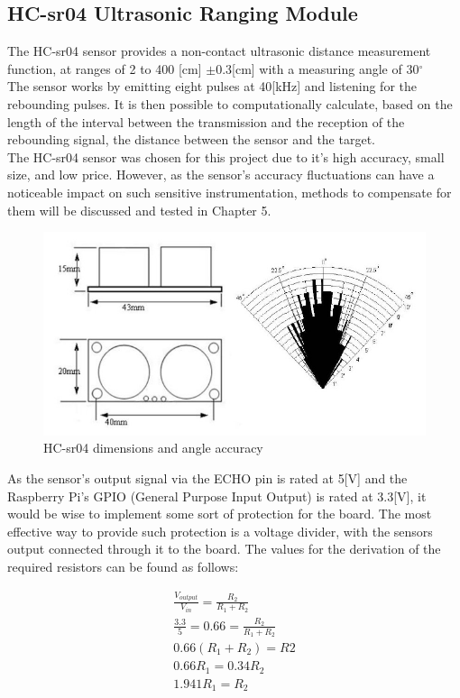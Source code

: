 \documentclass[twoside]{ctuthesis}
\theoremstyle{plain}
\theoremstyle{definition}
\theoremstyle{note}
\begin{document}
\subsection{HC-sr04 Ultrasonic Ranging Module}
The HC-sr04 sensor provides a non-contact ultrasonic distance measurement function, at ranges of 2 to 400 [cm] $\pm$0.3[cm] with a measuring angle of 30$^\circ$\\
The sensor works by emitting eight pulses at 40[kHz] and listening for the rebounding pulses. It is then possible to computationally calculate, based on the length of the interval between the transmission and the reception of the rebounding signal, the distance between the sensor and the target.\\
The HC-sr04 sensor was chosen for this project due to it's high accuracy, small size, and low price. However, as the sensor's accuracy fluctuations can have a noticeable impact on such sensitive instrumentation, methods to compensate for them will be discussed and tested in Chapter 5.\\

\begin{figure}[H]
	\centering
	\includegraphics[scale=0.5]{HCSR04_sizes}
	\caption{HC-sr04 dimensions and angle accuracy \cite{HC-SR04}}
\end{figure}

As the sensor's output signal via the ECHO pin is rated at 5[V] \cite{HC-SR04} and the Raspberry Pi's GPIO (General Purpose Input Output) is rated at 3.3[V]\cite{RasPi0W}, it would be wise to implement some sort of protection for the board. The most effective way to provide such protection is a voltage divider, with the sensors output connected through it to the board. The values for the derivation of the required resistors can be found as follows:

\begin{gather}\nonumber
	\frac{V_{output}}{V_{in}} = \frac{R_2}{R_1 + R_2}\\\nonumber
	\frac{3.3}{5}= 0.66 = \frac{R_2}{R_1 + R_2}\\\nonumber
	0.66(R_1+R_2) = R2\\\nonumber
	0.66R_1 = 0.34R_2\\
	1.941R_1 = R_2
\end{gather}
\end{document}
